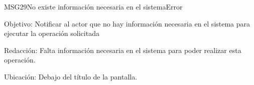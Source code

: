 \begin{mensaje}{MSG29}{No existe información necesaria en el sistema}{Error}
	\item [Objetivo:] Notificar al actor que no hay información necesaria en el sistema para ejecutar la operación solicitada
	\item[Redacción:] Falta información necesaria en el sistema para poder realizar esta operación.
	\item [Ubicación:] Debajo del título de la pantalla.
\end{mensaje}
